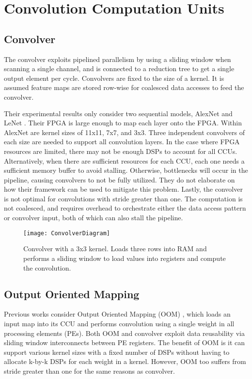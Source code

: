 \section{Convolution Computation Units}
\subsection{Convolver}
The convolver \cite{liu2016automatic} exploits pipelined parallelism by using a sliding window when scanning a single channel, and is connected to a reduction tree to get a single output element per cycle. Convolvers are fixed to the size of a kernel. It is assumed feature maps are stored row-wise for coalesced data accesses to feed the convolver.

Their experimental results only consider two sequential models, AlexNet \cite{krizhevsky2012imagenet} and LeNet \cite{lecun1998gradient}. Their FPGA is large enough to map each layer onto the FPGA. Within AlexNet are kernel sizes of 11x11, 7x7, and 3x3. Three independent convolvers of each size are needed to support all convolution layers. In the case where FPGA resources are limited, there may not be enough DSPs to account for all CCUs. Alternatively, when there are sufficient resources for each CCU, each one needs a sufficient memory buffer to avoid stalling. Otherwise, bottlenecks will occur in the pipeline, causing convolvers to not be fully utilized. They do not elaborate on how their framework can be used to mitigate this problem. Lastly, the convolver is not optimal for convolutions with stride greater than one. The computation is not coalesced, and requires overhead to orchestrate either the data access pattern or convolver input, both of which can also stall the pipeline.

\begin{figure}
		\texttt{[image: ConvolverDiagram]}
		\caption[Convolver Diagram]%
		{\narrower Convolver with a 3x3 kernel. Loads three rows into RAM and performs a sliding window to load values into registers and compute the convolution.}
		\label{control-file}
\end{figure}

\subsection{Output Oriented Mapping}
Previous works consider Output Oriented Mapping (OOM) \cite{zhang2015optimizing, chen2017eyeriss, rahman2016efficient}, which loads an input map into its CCU and performs convolution using a single weight in all processing elements (PEs). Both OOM and convolver exploit data reusability via sliding window interconnects between PE registers. The benefit of OOM is it can support various kernel sizes with a fixed number of DSPs without having to allocate k-by-k DSPs for each weight in a kernel. However, OOM too suffers from stride greater than one for the same reasons as convolver.

